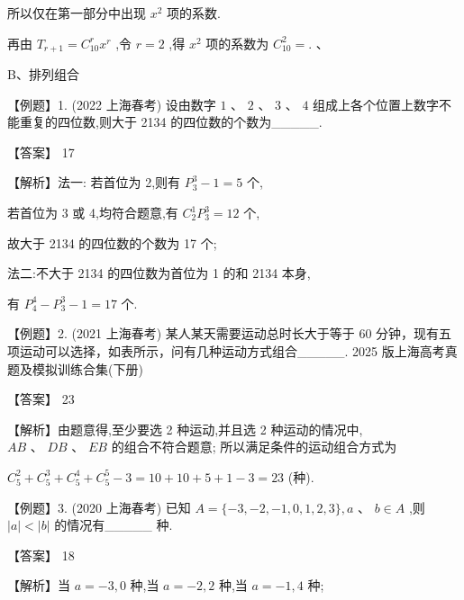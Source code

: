 \documentclass[10pt]{article}
\begin{document}
所以仅在第一部分中出现 \({x}^{2}\) 项的系数.

再由 \({T}_{r + 1} = {C}_{10}^{r}{x}^{r}\) ,令 \(r = 2\) ,得 \({x}^{2}\) 项的系数为 \({C}_{10}^{2} = .\) 、

B、排列组合

【例题】1. (2022 上海春考) 设由数字 \(1\text{ 、 }2\text{ 、 }3\text{ 、 }4\) 组成上各个位置上数字不能重复的四位数,则大于 2134 的四位数的个数为\_\_\_\_\_.

【答案】 17

【解析】法一: 若首位为 2,则有 \({P}_{3}^{3} - 1 = 5\) 个,

若首位为 3 或 4,均符合题意,有 \({C}_{2}^{1}{P}_{3}^{3} = {12}\) 个,

故大于 2134 的四位数的个数为 17 个;

法二:不大于 2134 的四位数为首位为 1 的和 2134 本身,

有 \({P}_{4}^{4} - {P}_{3}^{3} - 1 = {17}\) 个.

【例题】2. (2021 上海春考) 某人某天需要运动总时长大于等于 60 分钟，现有五项运动可以选择，如表所示，问有几种运动方式组合\_\_\_\_\_. 2025 版上海高考真题及模拟训练合集(下册)

\begin{center}
\end{center}

【答案】 23

【解析】由题意得,至少要选 2 种运动,并且选 2 种运动的情况中, \({AB}\text{ 、 }{DB}\text{ 、 }{EB}\) 的组合不符合题意; 所以满足条件的运动组合方式为

\({C}_{5}^{2} + {C}_{5}^{3} + {C}_{5}^{4} + {C}_{5}^{5} - 3 = {10} + {10} + 5 + 1 - 3 = {23}\) (种).

【例题】3. (2020 上海春考) 已知 \(A = \{  - 3, - 2, - 1,0,1,2,3\} ,a\text{ 、 }b \in  A\) ,则 \(\left| a\right|  < \left| b\right|\) 的情况有\_\_\_\_\_ 种.

【答案】 18

【解析】当 \(a =  - 3,0\) 种,当 \(a =  - 2,2\) 种,当 \(a =  - 1,4\) 种;
\end{document}
